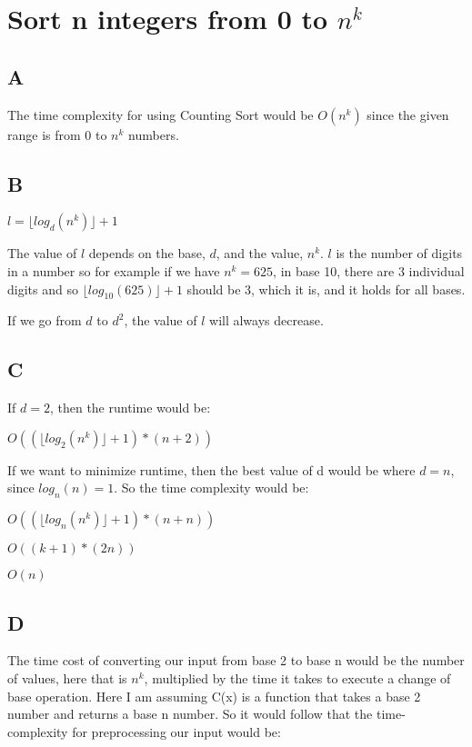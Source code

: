 \documentclass[12pt]{article}
\begin{document}
\section{Sort n integers from 0 to $n^k$}

\subsection{A}

The time complexity for using Counting Sort would be $O(n^k)$ since the given range is from $0$ to $n^k$ numbers.

\subsection{B}
\begin{center}
$l = \lfloor log_{d}(n^k) \rfloor + 1$
\end{center}
The value of $l$ depends on the base, $d$, and the value, $n^k$. $l$ is the number of digits in a number so for example if we have $n^k = 625$, in base 10, there are 3 individual digits and so $\lfloor log_{10}(625) \rfloor + 1$ should be 3, which it is, and it holds for all bases.

If we go from $d$ to $d^2$, the value of $l$ will always decrease.

\subsection{C}

If $d=2$, then the runtime would be:
\begin{center}
$O((\lfloor log_{2}(n^k) \rfloor + 1) * (n + 2))$
\end{center}

If we want to minimize runtime, then the best value of d would be where $d = n$, since $log_{n}(n) = 1$. So the time complexity would be:
\begin{center}
$O((\lfloor log_{n}(n^k) \rfloor + 1) * (n + n))$

$O((k + 1) * (2n))$

$O(n)$
\end{center}

\subsection{D}

The time cost of converting our input from base 2 to base n would be the number of values, here that is $n^k$, multiplied by the time it takes to execute a change of base operation. Here I am assuming C(x) is a function that takes a base 2 number and returns a base n number. So it would follow that the time-complexity for preprocessing our input would be: 
\end{document}
